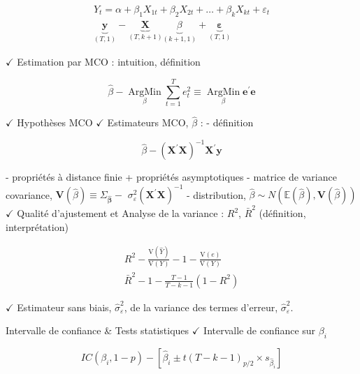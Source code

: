 $$
\begin{gathered}
	Y_t=\alpha+\beta_1 X_{1 t}+\beta_2 X_{2 t}+\ldots+\beta_k X_{k t}+\varepsilon_t \\
	\underbrace{\mathbf{y}}_{(T, 1)}-\underbrace{\mathbf{X}}_{(T, k+1)} \underbrace{\beta}_{(k+1,1)}+\underbrace{\boldsymbol{\varepsilon}}_{(T, 1)}
\end{gathered}
$$

$\checkmark$ Estimation par MCO : intuition, définition

$$
\hat{\beta}-\underset{\beta}{\operatorname{ArgMin}} \sum_{t=1}^T e_t^2 \equiv \underset{\beta}{\operatorname{ArgMin}} \mathbf{e}^{\prime} \mathbf{e}
$$

$\checkmark$ Hypothèses MCO
$\checkmark$ Estimateurs MCO, $\hat{\beta}$ :
- définition

$$
\hat{\beta}-\left(\mathbf{X}^{\prime} \mathbf{X}\right)^{-1} \mathbf{X}^{\prime} \mathbf{y}
$$

- propriétés à distance finie + propriétés asymptotiques
- matrice de variance covariance, $\mathbf{V}(\hat{\beta}) \equiv \Sigma_{\hat{\boldsymbol{\beta}}}-$ $\sigma_{\varepsilon}^2\left(\mathbf{X}^{\prime} \mathbf{X}\right)^{-1}$
- distribution, $\hat{\beta} \sim N(\mathbb{E}(\hat{\beta}), \mathbf{V}(\hat{\beta}))$
$\checkmark$ Qualité d'ajustement et Analyse de la variance : $R^2$, $\bar{R}^2$ (définition, interprétation)

$$
\begin{gathered}
	R^2-\frac{\mathrm{V}(\hat{Y})}{\mathrm{V}(Y)}-1-\frac{\mathrm{V}(e)}{\mathrm{V}(Y)} \\
	\bar{R}^2-1-\frac{T-1}{T-k-1}\left(1-R^2\right)
\end{gathered}
$$

$\checkmark$ Estimateur sans biais, $\hat{\sigma}_{\varepsilon}^2$, de la variance des termes d'erreur, $\hat{\sigma}_{\varepsilon}^2$.

Intervalle de confiance \& Tests statistiques
$\checkmark$ Intervalle de confiance sur $\beta_i$

$$
I C\left(\beta_i, 1-p\right)-\left[\hat{\beta}_i \pm t(T-k-1)_{p / 2} \times s_{\hat{\beta}_i}\right]
$$

